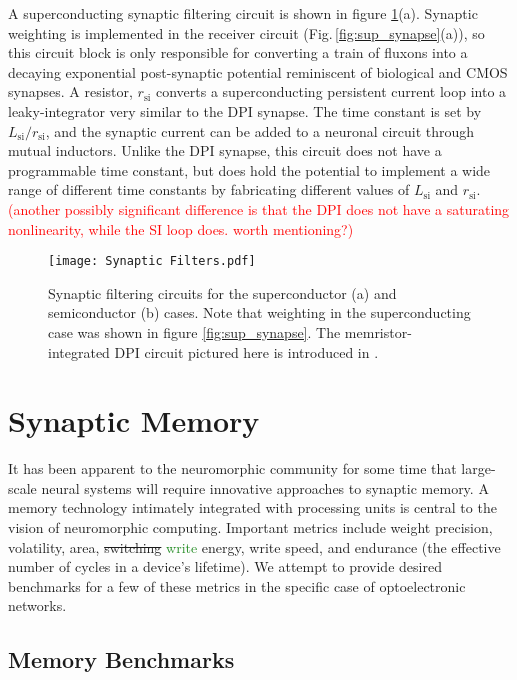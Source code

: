\documentclass[twocolumn]{article}
\begin{document}
A superconducting synaptic filtering circuit is shown in figure \ref{fig:filtering}(a). Synaptic weighting is implemented in the receiver circuit (Fig.\,\ref{fig:sup_synapse}(a)), so this circuit block is only responsible for converting a train of fluxons into a decaying exponential post-synaptic potential reminiscent of biological and CMOS synapses. A resistor, $r_{\mathrm{si}}$ converts a superconducting persistent current loop into a leaky-integrator very similar to the DPI synapse. The time constant is set by $L_{\mathrm{si}}/r_{\mathrm{si}}$, and the synaptic current can be added to a neuronal circuit through mutual inductors. Unlike the DPI synapse, this circuit does not have a programmable time constant, but does hold the potential to implement a wide range of different time constants by fabricating different values of $L_{\mathrm{si}}$ and $r_{\mathrm{si}}$. \textcolor{red}{(another possibly significant difference is that the DPI does not have a saturating nonlinearity, while the SI loop does. worth mentioning?)} 
\begin{figure}[h!]
    \centering
    \texttt{[image: Synaptic Filters.pdf]}
    \caption{Synaptic filtering circuits for the superconductor (a) and semiconductor (b) cases.  Note that weighting in the superconducting case was shown in figure \ref{fig:sup_synapse}. The memristor-integrated DPI circuit pictured here is introduced in \cite{dalgaty2019hybrid}. }
    \label{fig:filtering}
\end{figure}

\section{\label{sec:memory}Synaptic Memory}
It has been apparent to the neuromorphic community for some time that large-scale neural systems will require innovative approaches to synaptic memory. A memory technology intimately integrated with processing units is central to the vision of neuromorphic computing. Important metrics include weight precision, volatility, area, \sout{switching} \textcolor{ForestGreen}{write} energy, write speed, and endurance (the effective number of cycles in a device's lifetime). We attempt to provide desired benchmarks for a few of these metrics in the specific case of optoelectronic networks.

\subsection{Memory Benchmarks}
\end{document}
